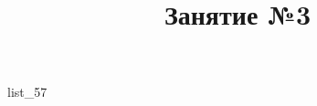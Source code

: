 \documentclass[12pt, a4paper]{article}
\begin{document}
	\title{Занятие №3}
	{list_57}
\end{document}
